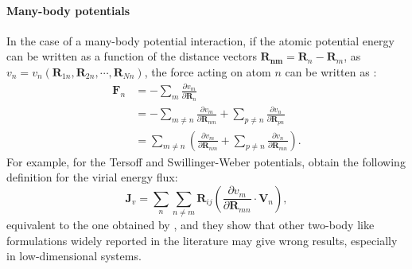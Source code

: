 \begin{LEtext}
\paragraph{Many-body potentials}
In the case of a many-body potential interaction, if the atomic potential energy can be written as a function of the distance vectors $\mathbf{R_{nm}}=\mathbf{R}_n-\mathbf{R}_m$, as $v_n = v_n(\mathbf{R}_{1n},\mathbf{R}_{2n},\cdots,\mathbf{R}_{Nn})$, the force acting on atom $n$ can be written as \cite{Fan2015,Hardy2016}:
\begin{align}
    \mathbf{F}_n &= -\sum_m \frac{\partial v_m}{\partial \mathbf{R}_n} \\
        &= -\sum_{m\neq n} \frac{\partial v_m}{\partial \mathbf{R}_{nm}} + \sum_{p\neq n} \frac{\partial v_n}{\partial \mathbf{R}_{pn}} \\
        &= \sum_{m\neq n} \left(\frac{\partial v_m}{\partial \mathbf{R}_{nm}} + \sum_{p\neq n} \frac{\partial v_n}{\partial \mathbf{R}_{mn}} \right).
\end{align}
For example, for the Tersoff \cite{Tersoff1989} and Swillinger-Weber \cite{Stillinger1985} potentials, \citet{Fan2015} obtain the following definition for the virial energy flux:
\begin{equation}
    \mathbf{J}_v = \sum_n \sum_{n\neq m} \mathbf{R}_{ij} \left(\frac{\partial v_m}{\partial \mathbf{R}_{mn}} \cdot \mathbf{V}_n \right) ,
\end{equation}
equivalent to the one obtained by \citet{Hardy1963}, and they show that other two-body like formulations widely reported in the literature may give wrong results, especially in low-dimensional systems.

\end{LEtext}


